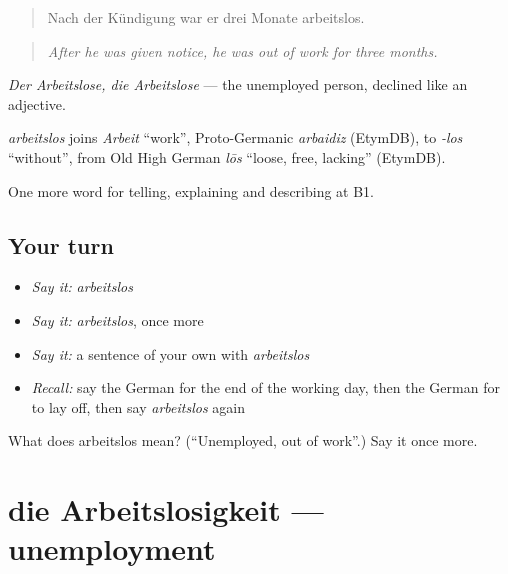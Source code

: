 \begin{quote}
Nach der Kündigung war er drei Monate arbeitslos.
\end{quote}

\begin{quote}
\emph{After he was given notice, he was out of work for three months.}
\end{quote}

\emph{Der Arbeitslose, die Arbeitslose} — the unemployed person, declined like an adjective.

\begin{cousinweb}
\emph{arbeitslos} joins \emph{Arbeit} \textquotedblleft{}work\textquotedblright{}, Proto-Germanic \emph{arbaidiz} (EtymDB), to \emph{-los} \textquotedblleft{}without\textquotedblright{}, from Old High German \emph{lōs} \textquotedblleft{}loose, free, lacking\textquotedblright{} (EtymDB).
\end{cousinweb}

\begin{grammarlens}[title={What you've built}]
One more word for telling, explaining and describing at B1.
\end{grammarlens}

\subsection*{Your turn}
\begin{itemize}
\raggedright
  \item \emph{Say it:} \emph{arbeitslos}
  \item \emph{Say it:} \emph{arbeitslos}, once more
  \item \emph{Say it:} a sentence of your own with \emph{arbeitslos}
  \item \emph{Recall:} say the German for the end of the working day, then the German for to lay off, then say \emph{arbeitslos} again
\end{itemize}

\begin{tcolorbox}[breakable,colback=teal!4,colframe=teal!35!black,title={Before you move on}]
What does arbeitslos mean? (\textquotedblleft{}Unemployed, out of work\textquotedblright{}.) Say it once more.
\end{tcolorbox}
\section[die Arbeitslosigkeit]{die Arbeitslosigkeit — unemployment}

